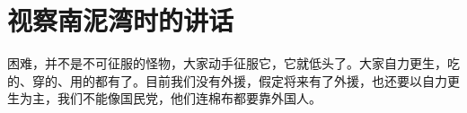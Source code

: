 \section[视察南泥湾时的讲话（一九四三年七月）]{视察南泥湾时的讲话}


困难，并不是不可征服的怪物，大家动手征服它，它就低头了。大家自力更生，吃的、穿的、用的都有了。目前我们没有外援，假定将来有了外援，也还要以自力更生为主，我们不能像国民党，他们连棉布都要靠外国人。

